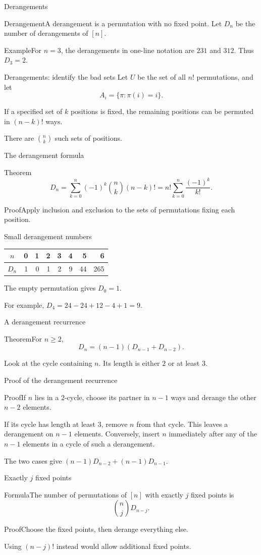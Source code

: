 \documentclass[aspectratio=169,11pt]{beamer}
\newcommand{\Def}[2]{\begin{block}{#1}#2\end{block}}
\newcommand{\Thm}[2]{\begin{block}{#1}#2\end{block}}
\renewcommand{\Proof}[1]{\begin{block}{Proof}\normalsize #1\end{block}}
\renewcommand{\Example}[1]{\begin{block}{Example}#1\end{block}}
\newcommand{\gap}{\par\medskip}
\begin{document}
\begin{frame}{Derangements}
\large
\Def{Derangement}{A derangement is a permutation with no fixed point. Let $D_n$ be the number of derangements of $[n]$.}
\Example{For $n=3$, the derangements in one-line notation are $231$ and $312$. Thus $D_3=2$.}
\end{frame}
\begin{frame}{Derangements: identify the bad sets}
\large
Let $U$ be the set of all $n!$ permutations, and let
\[A_i=\{\pi:\pi(i)=i\}.\]
\gap If a specified set of $k$ positions is fixed, the remaining positions can be permuted in $(n-k)!$ ways.
\gap There are $\binom nk$ such sets of positions.
\end{frame}
\begin{frame}{The derangement formula}
\large
\Thm{Theorem}{\[D_n=\sum_{k=0}^n(-1)^k\binom nk(n-k)!
=n!\sum_{k=0}^n\frac{(-1)^k}{k!}.\]}
\Proof{Apply inclusion and exclusion to the sets of permutations fixing each position.}
\end{frame}
\begin{frame}{Small derangement numbers}
\large
\begin{center}\renewcommand{\arraystretch}{1.6}
\begin{tabular}{c|rrrrrrr}
$n$&0&1&2&3&4&5&6\\\hline
$D_n$&1&0&1&2&9&44&265
\end{tabular}\end{center}
\gap The empty permutation gives $D_0=1$.
\gap For example, $D_4=24-24+12-4+1=9$.
\end{frame}
\begin{frame}{A derangement recurrence}
\large
\Thm{Theorem}{For $n\geq2$,
\[D_n=(n-1)(D_{n-1}+D_{n-2}).\]}
\gap Look at the cycle containing $n$. Its length is either $2$ or at least $3$.
\end{frame}
\begin{frame}{Proof of the derangement recurrence}
\large
\Proof{If $n$ lies in a $2$-cycle, choose its partner in $n-1$ ways and derange the other $n-2$ elements.\gap If its cycle has length at least $3$, remove $n$ from that cycle. This leaves a derangement on $n-1$ elements. Conversely, insert $n$ immediately after any of the $n-1$ elements in a cycle of such a derangement.\gap The two cases give $(n-1)D_{n-2}+(n-1)D_{n-1}$.}
\end{frame}
\begin{frame}{Exactly $j$ fixed points}
\large
\Thm{Formula}{The number of permutations of $[n]$ with exactly $j$ fixed points is
\[\binom njD_{n-j}.\]}
\Proof{Choose the fixed points, then derange everything else.}
\gap Using $(n-j)!$ instead would allow additional fixed points.
\end{frame}
\end{document}
